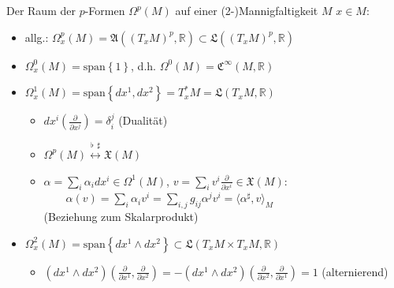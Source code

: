 \documentclass{beamer}
\newcommand{\R}{\mathds{R}}
\begin{document}
  \begin{frame}
    \begin{block}{Der Raum der \( p \)-Formen \( \Omega^{p}(M) \) auf einer (2-)Mannigfaltigkeit \( M \)}
      \( x \in M \):
      \begin{itemize}
        \item allg.: \(\Omega^{p}_{x}(M) = \mathfrak{A}(\left( T_{x}M \right)^{p}, \R) \subset \mathfrak{L}(\left( T_{x}M \right)^{p}, \R) \)
        \item \( \Omega^{0}_{x}(M) = \text{span}\left\{ 1 \right\} \), d.h. \( \Omega^{0}(M) = \mathfrak{C}^{\infty}(M, \R)\)
        \item \( \Omega^{1}_{x}(M) = \text{span}\left\{ dx^{1}, dx^{2} \right\} = T_{x}^{*}M = \mathfrak{L}(T_{x}M, \R) \) 
        \begin{itemize}
          \item \( dx^{i}\left(\frac{\partial}{\partial x^{j}}\right) = \delta_{i}^{j} \) (Dualität)
          \item \(\Omega^{p}(M) \overset{\flat\ \ \sharp}{\longleftrightarrow} \mathfrak{X}(M)\)
          \item  \( \alpha = \sum_{i}\alpha_{i}dx^{i} \in \Omega^{1}(M) \), \( v = \sum_{i}v^{i}\frac{\partial}{\partial x^{i}} \in \mathfrak{X}(M)  \):\\
              \( \qquad \alpha(v) = \sum_{i}\alpha_{i}v^{i} = \sum_{i,j}g_{ij}\alpha^{j}v^{i} = \langle \alpha^{\sharp}, v \rangle_{M} \)\\
              (Beziehung zum Skalarprodukt)
        \end{itemize}
        \item \( \Omega^{2}_{x}(M) = \text{span}\left\{ dx^{1} \wedge dx^{2}\right\} \subset \mathfrak{L}(T_{x}M \times T_{x}M, \R) \)
        \begin{itemize}
          \item \( \left(dx^{1}\wedge dx^{2}\right) \left(\frac{\partial}{\partial x^{1}}, \frac{\partial}{\partial x^{2}}\right)
              = -\left(dx^{1}\wedge dx^{2}\right) \left(\frac{\partial}{\partial x^{2}}, \frac{\partial}{\partial x^{1}}\right) = 1 \)
              (alternierend)
        \end{itemize}
      \end{itemize}
    \end{block}
  \end{frame}
\end{document}
